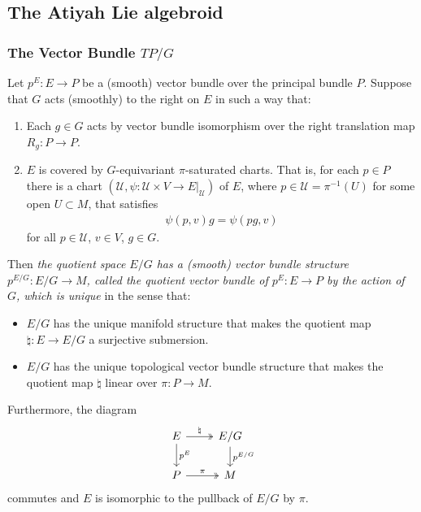 \subsection{The Atiyah Lie algebroid}

\subsubsection{The Vector Bundle $TP/G$}

\begin{proposition} \label{3.1.1}
Let $p^E: E \to P$ be a (smooth) vector bundle over the principal bundle $P$. Suppose that $G$ acts (smoothly) to the right on $E$ in such a way that:
\begin{enumerate}
    \item Each $g \in G$ acts by vector bundle isomorphism over the right translation map $R_g: P \to P$.
    
    \item $E$ is covered by $G$-equivariant $\pi$-saturated charts. That is, for each $p \in P$ there is a chart $(\mathcal U, \psi: \mathcal U \times V \to E|_{\mathcal U})$ of $E$, where $p \in \mathcal U = \pi^{-1}(U)$ for some open $U \subset M$, that satisfies 
    \begin{align*}
        \psi(p, v)g = \psi(pg, v)
    \end{align*}
    for all $p \in \mathcal U$, $v \in V$, $g \in G$.
\end{enumerate}
Then \textit{the quotient space $E/G$ has a (smooth) vector bundle structure $p^{E/G}: E/G \to M$, called \emph{the quotient vector bundle of $p^E: E \to P$ by the action of $G$}, which is unique} in the sense that:
\begin{itemize}
    \item $E/G$ has the unique manifold structure that makes the quotient map $\natural: E \to E/G$ a surjective submersion.
    \item $E/G$ has the unique topological vector bundle structure that makes the quotient map $\natural$ linear over $\pi: P \to M$.
\end{itemize}
Furthermore, the diagram
\begin{equation} \label{pullbackQuotient}
\begin{tikzcd}
    E \arrow[two heads]{r}{\natural} \arrow{d}{p^E} & E/G \arrow{d}{p^{E/G}} \\
    P \arrow[two heads]{r}{\pi}                     & M
\end{tikzcd}
\end{equation}
commutes and $E$ is isomorphic to the pullback of $E/G$ by $\pi$.


\end{proposition}
